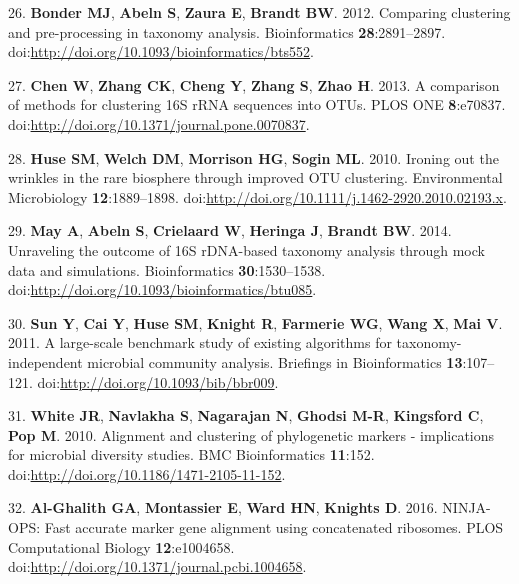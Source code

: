 \documentclass[11pt,]{article}
\begin{document}
26. \textbf{Bonder MJ}, \textbf{Abeln S}, \textbf{Zaura E},
\textbf{Brandt BW}. 2012. Comparing clustering and pre-processing in
taxonomy analysis. Bioinformatics \textbf{28}:2891--2897.
doi:\url{http://doi.org/10.1093/bioinformatics/bts552}.

27. \textbf{Chen W}, \textbf{Zhang CK}, \textbf{Cheng Y}, \textbf{Zhang
S}, \textbf{Zhao H}. 2013. A comparison of methods for clustering 16S
rRNA sequences into OTUs. PLOS ONE \textbf{8}:e70837.
doi:\url{http://doi.org/10.1371/journal.pone.0070837}.

28. \textbf{Huse SM}, \textbf{Welch DM}, \textbf{Morrison HG},
\textbf{Sogin ML}. 2010. Ironing out the wrinkles in the rare biosphere
through improved OTU clustering. Environmental Microbiology
\textbf{12}:1889--1898.
doi:\url{http://doi.org/10.1111/j.1462-2920.2010.02193.x}.

29. \textbf{May A}, \textbf{Abeln S}, \textbf{Crielaard W},
\textbf{Heringa J}, \textbf{Brandt BW}. 2014. Unraveling the outcome of
16S rDNA-based taxonomy analysis through mock data and simulations.
Bioinformatics \textbf{30}:1530--1538.
doi:\url{http://doi.org/10.1093/bioinformatics/btu085}.

30. \textbf{Sun Y}, \textbf{Cai Y}, \textbf{Huse SM}, \textbf{Knight R},
\textbf{Farmerie WG}, \textbf{Wang X}, \textbf{Mai V}. 2011. A
large-scale benchmark study of existing algorithms for
taxonomy-independent microbial community analysis. Briefings in
Bioinformatics \textbf{13}:107--121.
doi:\url{http://doi.org/10.1093/bib/bbr009}.

31. \textbf{White JR}, \textbf{Navlakha S}, \textbf{Nagarajan N},
\textbf{Ghodsi M-R}, \textbf{Kingsford C}, \textbf{Pop M}. 2010.
Alignment and clustering of phylogenetic markers - implications for
microbial diversity studies. BMC Bioinformatics \textbf{11}:152.
doi:\url{http://doi.org/10.1186/1471-2105-11-152}.

32. \textbf{Al-Ghalith GA}, \textbf{Montassier E}, \textbf{Ward HN},
\textbf{Knights D}. 2016. NINJA-OPS: Fast accurate marker gene alignment
using concatenated ribosomes. PLOS Computational Biology
\textbf{12}:e1004658.
doi:\url{http://doi.org/10.1371/journal.pcbi.1004658}.
\end{document}
